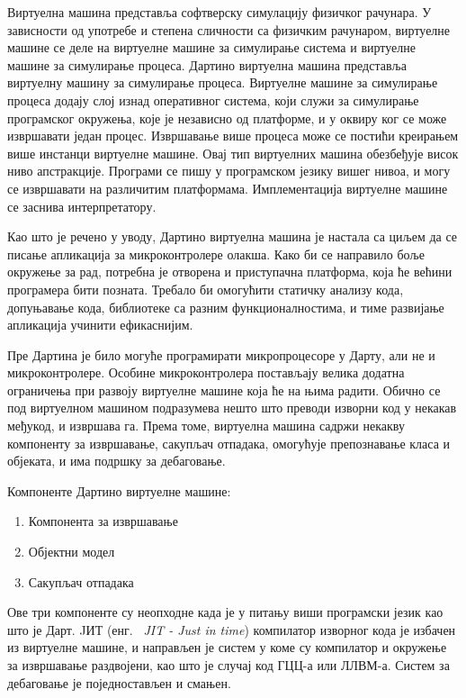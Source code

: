 \documentclass[12pt,oneside]{memoir}
\begin{document}
Виртуелна машина представља софтверску симулацију физичког рачунара. У зависности од употребе и степена сличности са физичким рачунаром, виртуелне машине се деле на виртуелне машине за симулирање система и виртуелне машине за симулирање процеса.
Дартино виртуелна машина представља виртуелну машину за симулирање процеса. Виртуелне машине за симулирање процеса додају слој изнад оперативног система, који служи за симулирање програмског окружења, које је независно од платформе, и у оквиру ког се може извршавати један процес. Извршавање више процеса може се постићи креирањем више инстанци виртуелне машине. Овај тип виртуелних машина обезбеђује висок ниво апстракције. Програми се пишу у програмском језику вишег нивоа, и могу се извршавати на различитим платформама. Имплементација виртуелне машине се заснива интерпретатору.

Као што је речено у уводу, Дартино виртуелна машина је настала са циљем да се писање апликација за микроконтролере олакша. Како би се направило боље окружење за рад, потребна је отворена и приступачна платформа, која ће већини програмера бити позната. Требало би омогућити статичку анализу кода, допуњавање кода, библиотеке са разним функционалностима, и тиме развијање апликација учинити ефикаснијим.

Пре Дартина је било могуће програмирати микропроцесоре у Дарту, али не и микроконтролере. Особине микроконтролера постављају велика додатна ограничења при развоју виртуелне машине која ће на њима радити. Обично се под виртуелном машином подразумева нешто што преводи изворни код у некакав међукод, и извршава га. Према томе, виртуелна машина садржи некакву компоненту за извршавање, сакупљач отпадака, омогућује препознавање класа и објеката, и има подршку за дебаговање.

Компоненте Дартино виртуелне машине:
\begin{enumerate}
\item Компонента за извршавање
\item Објектни модел
\item Сакупљач отпадака
\end{enumerate}

Ове три компоненте су неопходне када је у питању виши програмски језик као што је Дарт. JИТ (енг. ~\textit{JIT - Just in time}) компилатор изворног кода је избачен из виртуелне машине, и направљен је систем у коме су компилатор и окружење за извршавање раздвојени, као што је случај код ГЦЦ-а или ЛЛВМ-а. Систем за дебаговање је поједностављен и смањен.
\end{document}
